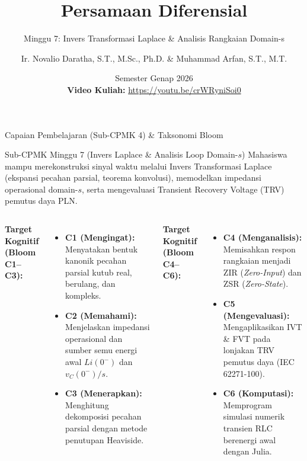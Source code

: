 \documentclass[aspectratio=169,10pt]{beamer}
\title[Persamaan Diferensial (Minggu 7)]{Persamaan Diferensial}
\subtitle{Minggu 7: Invers Transformasi Laplace \& Analisis Rangkaian Domain-s}
\author[Novalio \& Arfan (UNIB)]{Ir. Novalio Daratha, S.T., M.Sc., Ph.D. \& Muhammad Arfan, S.T., M.T.}
\institute[Teknik Elektro UNIB]{Program Studi S1 Teknik Elektro, Jurusan Teknik Elektro \& Informatika\\Fakultas Teknik, Universitas Bengkulu}
\date[2026]{Semester Genap 2026 \\[1.5mm] {\scriptsize\color{red!85!black}\textbf{Video Kuliah:}} {\scriptsize\url{https://youtu.be/crWRyniSoi0}} \quad \textbar \quad {\scriptsize\href{https://www.youtube.com/playlist?list=PLS5oOZWXZeTw}{\color{unibblue}\textbf{Playlist YouTube}}}}
\begin{document}
\begin{frame}[plain]
  \titlepage
\end{frame}

\begin{frame}{Capaian Pembelajaran (Sub-CPMK 4) \& Taksonomi Bloom}
  \begin{block}{Sub-CPMK Minggu 7 (Invers Laplace \& Analisis Loop Domain-$s$)}
    Mahasiswa mampu merekonstruksi sinyal waktu melalui Invers Transformasi Laplace (ekspansi pecahan parsial, teorema konvolusi), memodelkan impedansi operasional domain-$s$, serta mengevaluasi Transient Recovery Voltage (TRV) pemutus daya PLN.
  \end{block}
  \vspace{0.15cm}
  \begin{columns}[t]
    \textbf{Target Kognitif (Bloom C1--C3):}
    \begin{itemize}
      \item \textbf{C1 (Mengingat):} Menyatakan bentuk kanonik pecahan parsial kutub real, berulang, dan kompleks.
      \item \textbf{C2 (Memahami):} Menjelaskan impedansi operasional dan sumber semu energi awal $L i(0^-)$ dan $v_C(0^-)/s$.
      \item \textbf{C3 (Menerapkan):} Menghitung dekomposisi pecahan parsial dengan metode penutupan Heaviside.
    \end{itemize}

    \textbf{Target Kognitif (Bloom C4--C6):}
    \begin{itemize}
      \item \textbf{C4 (Menganalisis):} Memisahkan respon rangkaian menjadi ZIR (\textit{Zero-Input}) dan ZSR (\textit{Zero-State}).
      \item \textbf{C5 (Mengevaluasi):} Mengaplikasikan IVT \& FVT pada lonjakan TRV pemutus daya (IEC 62271-100).
      \item \textbf{C6 (Komputasi):} Memprogram simulasi numerik transien RLC berenergi awal dengan Julia.
    \end{itemize}
  \end{columns}
\end{frame}
\end{document}
